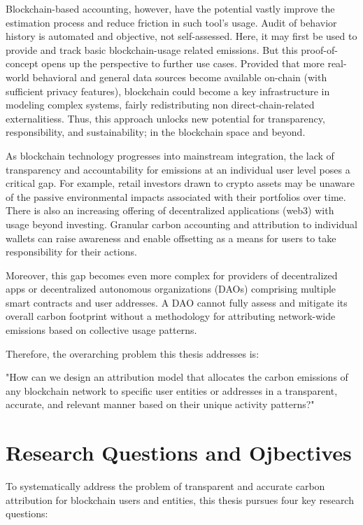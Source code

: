\documentclass[11pt]{report}
\begin{document}

Blockchain-based accounting, however, have the potential vastly improve the estimation process and reduce friction in such tool's usage. Audit of behavior history is automated and objective, not self-assessed. Here, it may first be used to provide and track basic blockchain-usage related emissions. But this proof-of-concept opens up the perspective to further use cases. Provided that more real-world behavioral and general data sources become available on-chain (with sufficient privacy features), blockchain could become a key infrastructure in modeling complex systems, fairly redistributing non direct-chain-related externalitiess. Thus, this approach unlocks new potential for transparency, responsibility, and sustainability; in the blockchain space and beyond.

As blockchain technology progresses into mainstream integration, the lack of transparency and accountability for emissions at an individual user level poses a critical gap. For example, retail investors drawn to crypto assets may be unaware of the passive environmental impacts associated with their portfolios over time. There is also an increasing offering of decentralized applications (web3) with usage beyond investing. Granular carbon accounting and attribution to individual wallets can raise awareness and enable offsetting as a means for users to take responsibility for their actions.

Moreover, this gap becomes even more complex for providers of decentralized apps or decentralized autonomous organizations (DAOs) comprising multiple smart contracts and user addresses. A DAO cannot fully assess and mitigate its overall carbon footprint without a methodology for attributing network-wide emissions based on collective usage patterns.

Therefore, the overarching problem this thesis addresses is:

"How can we design an attribution model that allocates the carbon emissions of any blockchain network to specific user entities or addresses in a transparent, accurate, and relevant manner based on their unique activity patterns?"


\section{Research Questions and Ojbectives}

To systematically address the problem of transparent and accurate carbon attribution for blockchain users and entities, this thesis pursues four key research questions:
\end{document}

